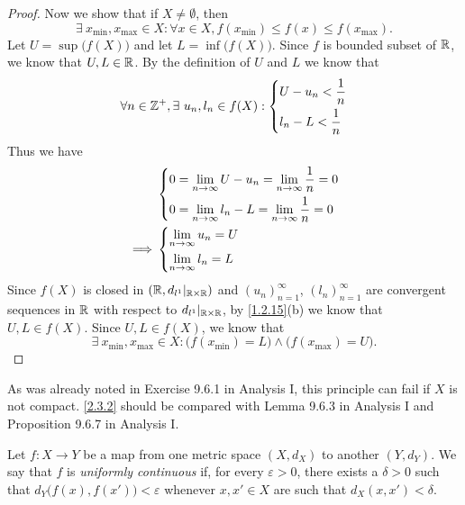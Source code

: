 \begin{proof}
  Now we show that if \(X \neq \emptyset\), then
  \[
    \exists\ x_{\min}, x_{\max} \in X : \forall x \in X, f(x_{\min}) \leq f(x) \leq f(x_{\max}).
  \]
  Let \(U = \sup\big(f(X)\big)\) and let \(L = \inf\big(f(X)\big)\).
  Since \(f\) is bounded subset of \(\mathbb{R}\), we know that \(U, L \in \mathbb{R}\).
  By the definition of \(U\) and \(L\) we know that
  \[
    \forall n \in \Z^+, \exists\ u_n, l_n \in f(X) : \begin{dcases}
      U - u_n < \dfrac{1}{n} \\
      l_n - L < \dfrac{1}{n}
    \end{dcases}
  \]
  Thus we have
  \begin{align*}
             & \begin{dcases}
                 0 = \lim_{n \to \infty} U - u_n = \lim_{n \to \infty} \dfrac{1}{n} = 0 \\
                 0 = \lim_{n \to \infty} l_n - L = \lim_{n \to \infty} \dfrac{1}{n} = 0
               \end{dcases} \\
    \implies & \begin{dcases}
                 \lim_{n \to \infty} u_n = U \\
                 \lim_{n \to \infty} l_n = L
               \end{dcases}
  \end{align*}
  Since \(f(X)\) is closed in \((\mathbb{R}, d_{l^1}|_{\mathbb{R} \times \mathbb{R}})\) and \((u_n)_{n = 1}^\infty\), \((l_n)_{n = 1}^\infty\) are convergent sequences in \(\mathbb{R}\) with respect to \(d_{l^1}|_{\mathbb{R} \times \mathbb{R}}\), by \cref{1.2.15}(b) we know that \(U, L \in f(X)\).
  Since \(U, L \in f(X)\), we know that
  \[
    \exists\ x_{\min}, x_{\max} \in X : \big(f(x_{\min}) = L\big) \land \big(f(x_{\max}) = U\big).
  \]
\end{proof}

\begin{rmk}\label{2.3.3}
  As was already noted in Exercise 9.6.1 in Analysis I, this principle can fail if \(X\) is not compact.
  \cref{2.3.2} should be compared with Lemma 9.6.3 in Analysis I and Proposition 9.6.7 in Analysis I.
\end{rmk}

\begin{defn}\label{2.3.4}
  Let \(f : X \to Y\) be a map from one metric space \((X, d_X)\) to another \((Y, d_Y)\).
  We say that \(f\) is \emph{uniformly continuous} if, for every \(\varepsilon > 0\), there exists a \(\delta > 0\) such that \(d_Y\big(f(x), f(x')\big) < \varepsilon\) whenever \(x, x' \in X\) are such that \(d_X(x, x') < \delta\).
\end{defn}

